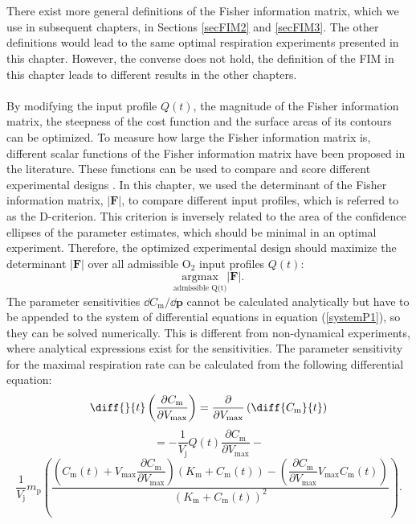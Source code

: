 \\
\\
{\color{red}There exist more general definitions of the Fisher information matrix, which we use in subsequent chapters, in Sections \ref{secFIM2} and \ref{secFIM3}. The other definitions would lead to the same optimal respiration experiments presented in this chapter. However, the converse does not hold, the definition of the FIM in this chapter leads to different results in the other chapters.}
\\
\\
By modifying the input profile $Q(t)$, the magnitude of the Fisher information matrix, the steepness of the cost function and the surface areas of its contours can be optimized. To measure how large the Fisher information matrix is, different scalar functions of the Fisher information matrix have been proposed in the literature. These functions can be used to compare and score different experimental designs \parencite{atkinson1}. In this chapter, we used the determinant of the Fisher information matrix, $|\mathbf{F}|$, to compare different input profiles, which is referred to as the D-criterion. This criterion is inversely related to the area of the confidence ellipses of the parameter estimates, which should be minimal in an optimal experiment. Therefore, the optimized experimental design should maximize the determinant $|\mathbf{F}|$ over all admissible $\text{O}_2$ input profiles $Q(t)$:
\begin{equation}
\underset{\text{admissible Q(t)}}{\text{argmax}}|\mathbf{F}|.
\end{equation}
The parameter sensitivities $\dd C_\text{m}/\dd \mathbf{p}$ cannot be calculated analytically but have to be appended to the system of differential equations in equation (\ref{systemP1}), so they can be solved numerically. This is different from non-dynamical experiments, where analytical expressions exist for the sensitivities. The parameter sensitivity for the maximal respiration rate can be calculated from the following differential equation:
\begin{equation}
\diff{}{t}\left(\dfrac{\partial C_\text{m}}{\partial V_{\text{max}}}\right) = 
\dfrac{\partial}{\partial V_{\text{max}}}\left(\diff{C_\text{m}}{t}\right)
\label{sens1}
\end{equation}
\begin{equation*}
=
 -\frac{ 1}{V_\text{j}}Q(t)\dfrac{\partial C_\text{m}}{\partial V_{\text{max}}}  -
\end{equation*}
\begin{equation*}
\frac{ 1}{V_\text{j}}m_\text{p}\left(\frac{ \left( C_\text{m}(t) + V_{\text{max}}\dfrac{\partial C_\text{m}}{\partial V_{\text{max}}}\right)\left(K_\text{m} + C_\text{m}(t)\right) - \left(\dfrac{\partial C_\text{m}}{\partial V_{\text{max}}}V_{\text{max}}C_\text{m}(t)\right)}{(K_\text{m} + C_\text{m}(t))^2}	
\right).
\end{equation*}
